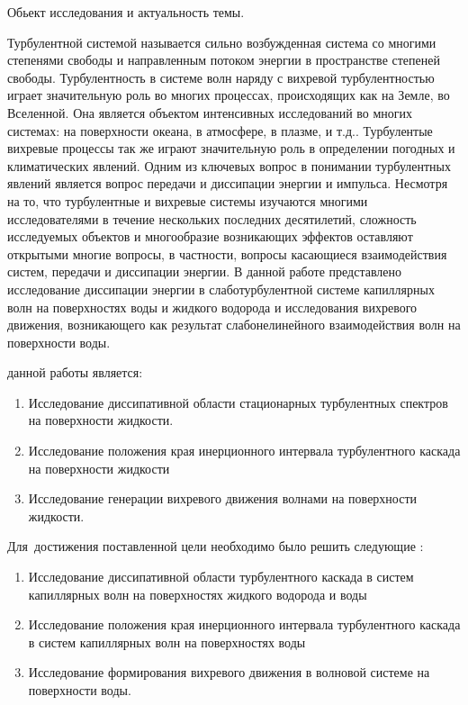 
{\actuality}Обьект исследования и актуальность темы.

Турбулентной системой называется сильно возбужденная система со многими степенями свободы и направленным потоком энергии в пространстве степеней свободы. Турбулентность в системе волн наряду с вихревой турбулентностью играет значительную роль во многих процессах, происходящих как на Земле, во Вселенной. Она является объектом  интенсивных исследований во многих системах: на поверхности океана, в атмосфере, в плазме, и т.д.. Турбулентые вихревые процессы так же играют значительную роль в определении погодных и климатических явлений. Одним из ключевых вопрос в понимании турбулентных явлений является вопрос передачи и диссипации энергии и импульса. 
Несмотря на то, что турбулентные и вихревые системы изучаются многими исследователями в течение нескольких последних десятилетий, сложность исследуемых объектов и многообразие возникающих эффектов оставляют открытыми многие вопросы, в частности, вопросы касающиеся взаимодействия систем, передачи и диссипации энергии. 
В данной работе представлено исследование диссипации энергии в слаботурбулентной системе капиллярных волн на поверхностях воды и жидкого водорода и исследования вихревого движения, возникающего как результат слабонелинейного взаимодействия волн на поверхности воды.

{\aim} данной работы является: 
\begin{enumerate}
	\item Исследование диссипативной области стационарных турбулентных спектров на поверхности жидкости.
	\item Исследование положения края инерционного интервала турбулентного каскада на поверхности жидкости
	\item Исследование генерации вихревого движения волнами на поверхности жидкости.
\end{enumerate}

Для~достижения поставленной цели необходимо было решить следующие {\tasks}:
\begin{enumerate}
	\item Исследование диссипативной области турбулентного каскада в систем капиллярных волн на поверхностях жидкого водорода и воды
	\item Исследование положения края инерционного интервала турбулентного каскада в систем капиллярных волн на поверхностях воды
	\item Исследование формирования вихревого движения в волновой системе на поверхности воды.
\end{enumerate}

